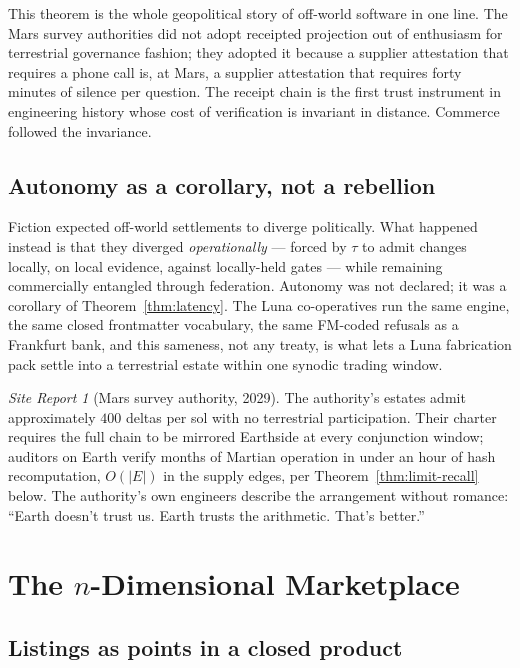 \documentclass[11pt,a4paper]{report}
\theoremstyle{definition}
\theoremstyle{remark}
\newtheorem{station}[theorem]{Site Report}
\newcommand{\lat}{\tau}
\begin{document}
This theorem is the whole geopolitical story of off-world software in one
line. The Mars survey authorities did not adopt receipted projection out
of enthusiasm for terrestrial governance fashion; they adopted it because
a supplier attestation that requires a phone call is, at Mars, a supplier
attestation that requires forty minutes of silence per question. The
receipt chain is the first trust instrument in engineering history whose
cost of verification is invariant in distance. Commerce followed the
invariance.

\section{Autonomy as a corollary, not a rebellion}

Fiction expected off-world settlements to diverge politically. What
happened instead is that they diverged \emph{operationally} --- forced by
$\lat$ to admit changes locally, on local evidence, against locally-held
gates --- while remaining commercially entangled through federation.
Autonomy was not declared; it was a corollary of Theorem~\ref{thm:latency}.
The Luna co-operatives run the same engine, the same closed frontmatter
vocabulary, the same FM-coded refusals as a Frankfurt bank, and this
sameness, not any treaty, is what lets a Luna fabrication pack settle into
a terrestrial estate within one synodic trading window.

\begin{station}[Mars survey authority, 2029]\label{st:mars}
The authority's estates admit approximately $400$ deltas per sol with no
terrestrial participation. Their charter requires the full chain to be
mirrored Earthside at every conjunction window; auditors on Earth verify
months of Martian operation in under an hour of hash recomputation,
$O(|E|)$ in the supply edges, per Theorem~\ref{thm:limit-recall} below.
The authority's own engineers describe the arrangement without romance:
``Earth doesn't trust us. Earth trusts the arithmetic. That's better.''
\end{station}

\chapter{The $n$-Dimensional Marketplace}

\section{Listings as points in a closed product}
\end{document}
